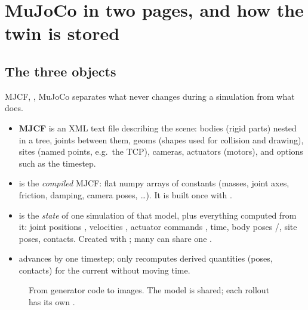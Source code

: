 \section{MuJoCo in two pages, and how the twin is stored}\label{twin:sec:mujoco}
\subsection{The three objects}
\begin{newc}{MJCF, , }
MuJoCo separates what never changes during a simulation from what does.
\begin{itemize}[leftmargin=*]
\item \textbf{MJCF} is an XML text file describing the scene: bodies (rigid parts) nested in a tree, joints between them, geoms (shapes used for collision and drawing), sites (named points, e.g.\ the TCP), cameras, actuators (motors), and options such as the timestep.
\item \textbf{} is the \emph{compiled} MJCF: flat numpy arrays of constants (masses, joint axes, friction, damping, camera poses, \ldots). It is built once with .
\item \textbf{} is the \emph{state} of one simulation of that model, plus everything computed from it: joint positions , velocities , actuator commands , time, body poses /, site poses, contacts. Created with ; many  can share one .
\item \textbf{} advances  by one timestep;  only recomputes derived quantities (poses, contacts) for the current  without moving time.
\end{itemize}
\end{newc}

\begin{figure}[h]
\centering

\caption{From generator code to images. The model is shared; each rollout has its own .}
\label{twin:fig:mujoco}
\end{figure}

